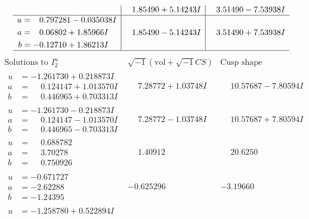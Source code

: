 \documentclass[1p]{elsarticle_modified}
\theoremstyle{definition}
\newcommand{\I}{\sqrt{-1}}
\begin{document}
$$\begin{array}{c|c|c}
 & \phantom{-}1.85490 + 5.14243 I & \phantom{-}3.51490 - 7.53938 I \\ \hline\begin{aligned}
u &= \phantom{-}0.797281 - 0.035038 I \\
a &= \phantom{-}0.06802 + 1.85966 I \\
b &= -0.12710 + 1.86213 I\end{aligned}
 & \phantom{-}1.85490 - 5.14243 I & \phantom{-}3.51490 + 7.53938 I\\
 \hline 
 \end{array}$$\newpage$$\begin{array}{c|c|c}  
\text{Solutions to }I^u_{2}& \I (\text{vol} + \sqrt{-1}CS) & \text{Cusp shape}\\
 \hline 
\begin{aligned}
u &= -1.261730 + 0.218873 I \\
a &= \phantom{-}0.124147 + 1.013570 I \\
b &= \phantom{-}0.446965 + 0.703313 I\end{aligned}
 & \phantom{-}7.28772 + 1.03748 I & \phantom{-}10.57687 - 7.80594 I \\ \hline\begin{aligned}
u &= -1.261730 - 0.218873 I \\
a &= \phantom{-}0.124147 - 1.013570 I \\
b &= \phantom{-}0.446965 - 0.703313 I\end{aligned}
 & \phantom{-}7.28772 - 1.03748 I & \phantom{-}10.57687 + 7.80594 I \\ \hline\begin{aligned}
u &= \phantom{-}0.688782\phantom{ +0.000000I} \\
a &= \phantom{-}3.70278\phantom{ +0.000000I} \\
b &= \phantom{-}0.750926\phantom{ +0.000000I}\end{aligned}
 & \phantom{-}1.40912\phantom{ +0.000000I} & \phantom{-}20.6250\phantom{ +0.000000I} \\ \hline\begin{aligned}
u &= -0.671727\phantom{ +0.000000I} \\
a &= -2.62288\phantom{ +0.000000I} \\
b &= -1.24395\phantom{ +0.000000I}\end{aligned}
 & -0.625296\phantom{ +0.000000I} & -3.19660\phantom{ +0.000000I} \\ \hline\begin{aligned}
u &= -1.258780 + 0.522894 I \\

\end{aligned}
\end{array}$$
\end{document}
